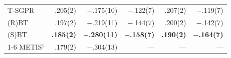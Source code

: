 \begin{table}[t]
\begin{tabular}{@{}lrrrrr@{}}
T-SGPR & .205{\scriptsize(2)} & \(-\).175{\scriptsize(10)} & \(-\).122{\scriptsize(7)} & .207{\scriptsize(2)} & \(-\).119{\scriptsize(7)} \\
(R)BT & .197{\scriptsize(2)} & \(-\).219{\scriptsize(11)} & \(-\).144{\scriptsize(7)} & .200{\scriptsize(2)} & \(-\).142{\scriptsize(7)} \\
(S)BT & \textbf{.185{\scriptsize(2)}} & \textbf{\(-\).280{\scriptsize(11)}} & \textbf{\(-\).158{\scriptsize(7)}} & \textbf{.190{\scriptsize(2)}} & \textbf{\(-\).164{\scriptsize(7)}} \\
\cmidrule{1-6}
METIS\(^\dagger\) & .179{\scriptsize(2)} & \(-\).304{\scriptsize(13)} & --- & --- & --- \\
\bottomrule
\end{tabular}
\end{table}
